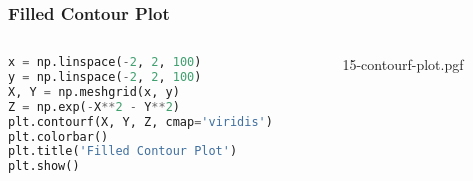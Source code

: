 \documentclass[beamer, en, version=2.0]{huangfusl-template}
\begin{document}
    \begin{frame}[fragile]
        \frametitle{Filled Contour Plot}

        \begin{columns}
        \begin{column}{0.5\textwidth}
\begin{lstlisting}[language=python, breaklines]
x = np.linspace(-2, 2, 100)
y = np.linspace(-2, 2, 100)
X, Y = np.meshgrid(x, y)
Z = np.exp(-X**2 - Y**2)
plt.contourf(X, Y, Z, cmap='viridis')
plt.colorbar()
plt.title('Filled Contour Plot')
plt.show()
\end{lstlisting}
        \end{column}
        \begin{column}{0.5\textwidth}
            {15-contourf-plot.pgf}
        \end{column}
        \end{columns}
    \end{frame}
\end{document}
